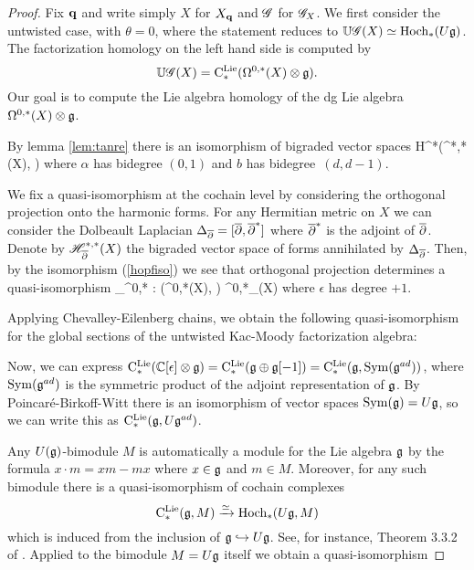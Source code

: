 \begin{proof}
Fix ${\bf q}$ and write simply $X$ for $X_{\bf q}$ and $\mathscr G$ for $\mathscr G_X$. 
We first consider the untwisted case, with $\theta = 0$, where the statement reduces to $\mathbb U\mathscr G(X) \simeq {\rm Hoch}_*(U \mathfrak g)$.
The factorization homology on the left hand side is computed by
\[
\mathbb U \mathscr G (X) = {\rm C}^{\rm Lie}_*(\Omega^{0,*}(X) \otimes \mathfrak g) .
\]
Our goal is to compute the Lie algebra homology of the dg Lie algebra $\Omega^{0,*}(X) \otimes \mathfrak g$.  

By lemma \ref{lem:tanre} there is an isomorphism of bigraded vector spaces
\beqn\label{hopfiso}
H^*\left(\Omega^{*,*}(X), \dbar\right) \cong \CC[\alpha,b]
\eeqn
where $\alpha$ has bidegree $(0,1)$ and $b$ has bidegree~$(d,d-1)$. 


We fix a quasi-isomorphism at the cochain level by considering the orthogonal projection onto the harmonic forms. 
For any Hermitian metric on $X$ we can consider the Dolbeault Laplacian $\Delta_{\overline{\partial}} = [\overline{\partial},\overline{\partial}^*]$ where $\overline{\partial}^*$ is the adjoint of $\overline{\partial}$.
Denote by $\mathscr H^{*,*}_{\overline{\partial}}(X)$ the bigraded vector space of forms annihilated by $\Delta_{\overline{\partial}}$. 
Then, by the isomorphism (\ref{hopfiso}) we see that orthogonal projection determines a quasi-isomorphism
\beqn\label{hopfquasi}
\pi_{\sH}^{0,*} : \left(\Omega^{0,*}(X), \dbar \right) \xto{\simeq} \sH^{0,*}_{\dbar}(X) \cong \CC[\epsilon]
\eeqn
where $\epsilon$ has degree $+1$. 



Applying Chevalley-Eilenberg chains, we obtain the following quasi-isomorphism for the global sections of the untwisted Kac-Moody factorization algebra:
\beqn\label{hopfquasi3}
\eeqn
Now, we can express ${\rm C}^{\rm Lie}_*(\mathbb C[\epsilon] \otimes \mathfrak g) = {\rm C}^{\rm Lie}_*(\mathfrak g \oplus \mathfrak g[-1]) = {\rm C}^{\rm Lie}_*(\mathfrak g, {\rm Sym} (\mathfrak g^{ad}))$, where ${\rm Sym}(\mathfrak g^{ad})$ is the symmetric product of the adjoint representation of $\mathfrak g$. 
By Poincar\'{e}-Birkoff-Witt there is an isomorphism of vector spaces ${\rm Sym}(\mathfrak g) = U \mathfrak g$, so we can write this as ${\rm C}^{\rm Lie}_*(\mathfrak g, U \mathfrak g^{ad})$.

Any $U(\mathfrak g)$-bimodule $M$ is automatically a module for the Lie algebra $\mathfrak g$ by the formula $x \cdot m = xm - mx$ where $x \in \mathfrak g$ and $m \in M$.
Moreover, for any such bimodule there is a quasi-isomorphism of cochain complexes 
\[
{\rm C}^{\rm Lie}_*(\mathfrak g, M) \xrightarrow{\simeq} {\rm Hoch}_*(U\mathfrak g, M) 
\]
which is induced from the inclusion of $\mathfrak g \hookrightarrow U \mathfrak g$. 
See, for instance, Theorem 3.3.2 of \cite{LodayCyclic}.
Applied to the bimodule $M = U\mathfrak g$ itself we obtain a quasi-isomorphism 


\end{proof}
